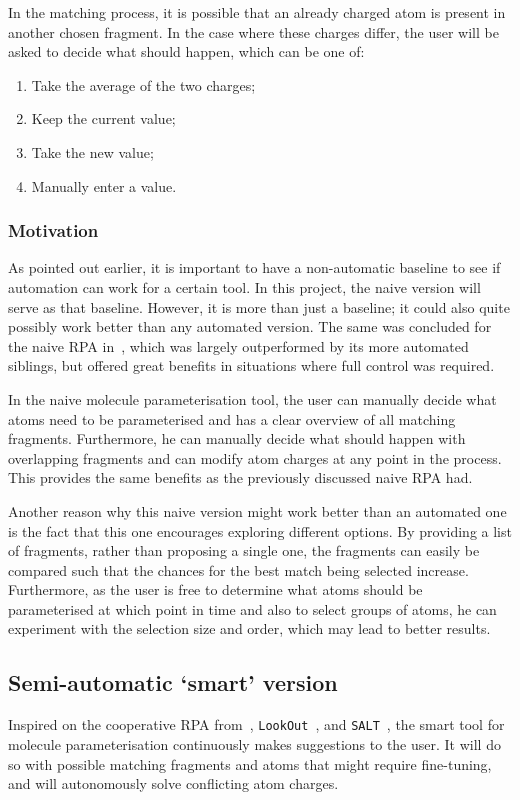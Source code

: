 \noindent
In the matching process, it is possible that an already charged atom is present in another chosen fragment. In the case where these charges differ, the user will be asked to decide what should happen, which can be one of:
\begin{enumerate}[itemsep=.1em, parsep=.2em, topsep=0em]
\item Take the average of the two charges;
\item Keep the current value;
\item Take the new value;
\item Manually enter a value.
\end{enumerate}

\vspace{-.2cm}
\subsubsection{Motivation}
\vspace{-.2cm}
As pointed out earlier, it is important to have a non-automatic baseline to see if automation can work for a certain tool. In this project, the naive version will serve as that baseline. However, it is more than just a baseline; it could also quite possibly work better than any automated version. The same was concluded for the naive RPA in~\cite{payne2000varying}, which was largely outperformed by its more automated siblings, but offered great benefits in situations where full control was required.

In the naive molecule parameterisation tool, the user can manually decide what atoms need to be parameterised and has a clear overview of all matching fragments. Furthermore, he can manually decide what should happen with overlapping fragments and can modify atom charges at any point in the process. This provides the same benefits as the previously discussed naive RPA had.

Another reason why this naive version might work better than an automated one is the fact that this one encourages exploring different options. By providing a list of fragments, rather than proposing a single one, the fragments can easily be compared such that the chances for the best match being selected increase. Furthermore, as the user is free to determine what atoms should be parameterised at which point in time and also to select groups of atoms, he can experiment with the selection size and order, which may lead to better results.


\subsection{Semi-automatic `smart' version}
Inspired on the cooperative RPA from~\cite{payne2000varying}, \verb|LookOut|~\cite{horvitz1999principles}, and \verb|SALT|~\cite{marcus1987taking}, the smart tool for molecule parameterisation continuously makes suggestions to the user. It will do so with possible matching fragments and atoms that might require fine-tuning, and will autonomously solve conflicting atom charges.

